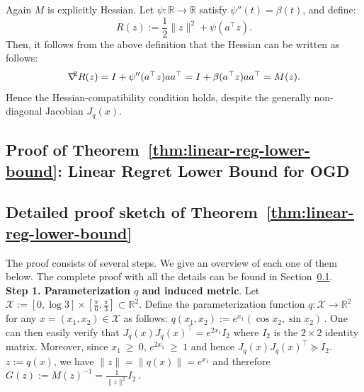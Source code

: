 \documentclass[a4paper,11pt,fullpage]{article}
\theoremstyle{plain}
\theoremstyle{definition}
\theoremstyle{plain}
\renewcommand{\geq}{~\ge~}
\let\nablaold\nabla
\renewcommand{\nabla}{\nablaold\mkern-2.5mu}
\begin{document}
Again \(M\) is explicitly Hessian. Let \(\psi:\mathbb R\to\mathbb R\) satisfy $\psi''(t)=\beta(t)$, 
and define: 
\[
    R(z):=\frac12\|z\|^2+\psi(a^\top z).
\]
Then, it follows from the above definition that the Hessian can be written as follows: 
\[
    \nabla^2R(z)
    =
    I+\psi''(a^\top z)aa^\top
    =
    I+\beta(a^\top z)aa^\top
    =
    M(z).
\]
Hence the Hessian-compatibility condition holds, despite the generally non-diagonal Jacobian \(J_q(x)\).

\subsection{Proof of Theorem~\ref{thm:linear-reg-lower-bound}: Linear Regret Lower Bound for OGD}
\label{app:proof-thm-linear-reg-lower-bound}

\subsection{Detailed proof sketch of Theorem~\ref{thm:linear-reg-lower-bound}} 
\label{app:detailed-proof-sketch-thm-linear-reg-lower-bound}

The proof consists of several steps. We give an overview of each one of them below. 
The complete proof with all the details can be found in Section~\ref{app:proof-thm-linear-reg-lower-bound}.\\ 

\noindent\textbf{Step 1. Parameterization $q$ and induced metric}. 
Let $\mathcal{X} := [0,\log 3] \times [\frac \pi 6, \frac \pi 3] \subset \mathbb{R}^2.$ Define the parameterization function $q: \mathcal{X} \to \mathbb{R}^2$ for any $x = (x_1, x_2) \in \mathcal{X}$ as follows: 
$q(x_1,x_2) := e^{x_1} (\cos x_2, \sin x_2)\,.$ 
One can then easily verify that $J_q(x) J_q(x)^{\top} = e^{2x_1} I_2$ where $I_2$ is the $2\times 2$ identity matrix. 
Moreover, since $x_1 \geq 0$, $e^{2x_1} \geq 1$ and hence $J_q(x) J_q(x)^{\top} \succeq I_2$. 
$z := q(x)$, we have $\|z\| = \|q(x)\| = e^{x_1}$ and therefore $G(z) := M(z)^{-1} = \frac{1}{\|z\|^2} I_2\,.$ 
\end{document}
